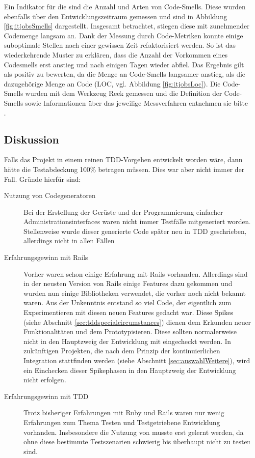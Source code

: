 Ein Indikator für die  sind die Anzahl und Arten von Code-Smells. Diese wurden ebenfalls über den Entwicklungszeitraum gemessen und sind in Abbildung \ref{fig:itjobsSmells} dargestellt. Insgesamt betrachtet, stiegen diese mit zunehmender Codemenge langsam an. Dank der Messung durch Code-Metriken konnte einige suboptimale Stellen nach einer gewissen Zeit refaktorisiert werden. So ist das wiederkehrende Muster zu erklären, dass die Anzahl der Vorkommen eines Codesmells erst anstieg und nach einigen Tagen wieder abfiel. Das Ergebnis gilt als positiv zu bewerten, da die Menge an Code-Smells langsamer anstieg, als die dazugehörige Menge an Code (LOC, vgl. Abbildung \ref{fig:itjobsLoc}). Die Code-Smells wurden mit dem Werkzeug Reek gemessen und die Definition der Code-Smells sowie Informationen über das jeweilige Messverfahren entnehmen sie bitte \citep{kevin_rutherford_code_2010}.

\subsection*{Diskussion}
Falls das Projekt in einem reinen TDD-Vorgehen entwickelt worden wäre, dann hätte die Testabdeckung 100\% betragen müssen. Dies war aber nicht immer der Fall. Gründe hierfür sind:
\begin{description}
 \item[Nutzung von Codegeneratoren] Bei der Erstellung der Gerüste und der Programmierung einfacher Administrationsinterfaces waren nicht immer Testfälle mitgeneriert worden. Stellenweise wurde dieser generierte Code später neu in TDD geschrieben, allerdings nicht in allen Fällen
 \item[Erfahrungsgewinn mit Rails] Vorher waren schon einige Erfahrung mit Rails vorhanden. Allerdings sind in der neusten Version von Rails einige Features dazu gekommen und wurden nun einige Bibliotheken verwendet, die vorher noch nicht bekannt waren. Aus der Unkenntnis entstand so viel Code, der eigentlich zum Experimentieren mit diesen neuen Features gedacht war. Diese Spikes (siehe Abschnitt \ref{sec:tddspecialcircumstances}) dienen dem Erkunden neuer Funktionalitäten und dem Prototypisieren. Diese sollten normalerweise nicht in den Hauptzweig der Entwicklung mit eingecheckt werden. In zukünftigen Projekten, die nach dem Prinzip der kontinuierlichen Integration stattfinden werden (siehe Abschnitt \ref{sec:auswahlWeitere}), wird ein Einchecken dieser Spikephasen in den Hauptzweig der Entwicklung nicht erfolgen.
 \item[Erfahrungsgewinn mit TDD] Trotz bisheriger Erfahrungen mit Ruby und Rails waren nur wenig Erfahrungen zum Thema Testen und Testgetriebene Entwicklung vorhanden. Insbesondere die Nutzung von  musste erst gelernt werden, da ohne diese bestimmte Testszenarien schwierig bis überhaupt nicht zu testen sind.
\end{description}

